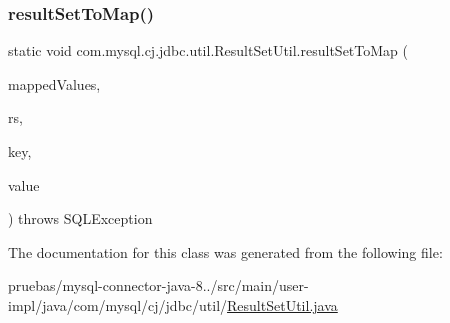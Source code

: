 \mbox{\label{classcom_1_1mysql_1_1cj_1_1jdbc_1_1util_1_1_result_set_util_a34585de68e6f5962152ed491eea9c1da}} 
\subsubsection{\texorpdfstring{result\+Set\+To\+Map()}{resultSetToMap()}\hspace{0.1cm}{\footnotesize\ttfamily [2/2]}}
{\footnotesize\ttfamily static void com.\+mysql.\+cj.\+jdbc.\+util.\+Result\+Set\+Util.\+result\+Set\+To\+Map (\begin{DoxyParamCaption}\item[{Map}]{mapped\+Values,  }\item[{java.\+sql.\+Result\+Set}]{rs,  }\item[{int}]{key,  }\item[{int}]{value }\end{DoxyParamCaption}) throws S\+Q\+L\+Exception\hspace{0.3cm}{\ttfamily [static]}}



The documentation for this class was generated from the following file\+:\begin{DoxyCompactItemize}
\item 
pruebas/mysql-\/connector-\/java-\/8../src/main/user-\/impl/java/com/mysql/cj/jdbc/util/\mbox{\hyperlink{_result_set_util_8java}{Result\+Set\+Util.\+java}}\end{DoxyCompactItemize}
